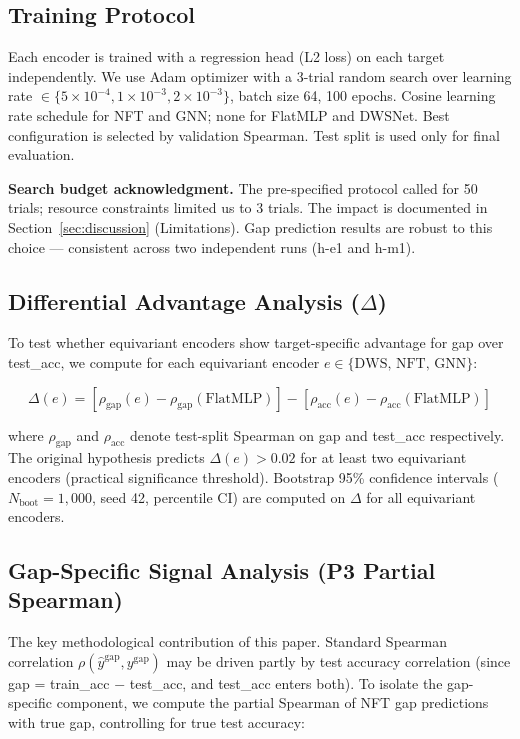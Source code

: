\subsection{Training Protocol}

Each encoder is trained with a regression head (L2 loss) on each target independently. We use Adam
optimizer with a 3-trial random search over learning rate $\in \{5\times10^{-4}, 1\times10^{-3},
2\times10^{-3}\}$, batch size 64, 100 epochs. Cosine learning rate schedule for NFT and GNN; none for
FlatMLP and DWSNet. Best configuration is selected by validation Spearman. Test split is used only for
final evaluation.

\textbf{Search budget acknowledgment.} The pre-specified protocol called for 50 trials; resource constraints
limited us to 3 trials. The impact is documented in Section~\ref{sec:discussion} (Limitations). Gap prediction results are
robust to this choice --- consistent across two independent runs (h-e1 and h-m1).

\subsection{Differential Advantage Analysis ($\Delta$)}

To test whether equivariant encoders show target-specific advantage for gap over test\_acc, we compute
for each equivariant encoder $e \in \{\text{DWS, NFT, GNN}\}$:

\begin{equation}
\Delta(e) = [\rho_{\text{gap}}(e) - \rho_{\text{gap}}(\text{FlatMLP})] - [\rho_{\text{acc}}(e) - \rho_{\text{acc}}(\text{FlatMLP})]
\end{equation}

where $\rho_{\text{gap}}$ and $\rho_{\text{acc}}$ denote test-split Spearman on gap and test\_acc
respectively. The original hypothesis predicts $\Delta(e) > 0.02$ for at least two equivariant encoders
(practical significance threshold). Bootstrap 95\% confidence intervals ($N_{\text{boot}} = 1{,}000$,
seed 42, percentile CI) are computed on $\Delta$ for all equivariant encoders.

\subsection{Gap-Specific Signal Analysis (P3 Partial Spearman)}

The key methodological contribution of this paper. Standard Spearman correlation $\rho(\hat{y}^{\text{gap}}, y^{\text{gap}})$
may be driven partly by test accuracy correlation (since gap = train\_acc $-$ test\_acc, and test\_acc enters
both). To isolate the gap-specific component, we compute the partial Spearman of NFT gap predictions with
true gap, controlling for true test accuracy:

